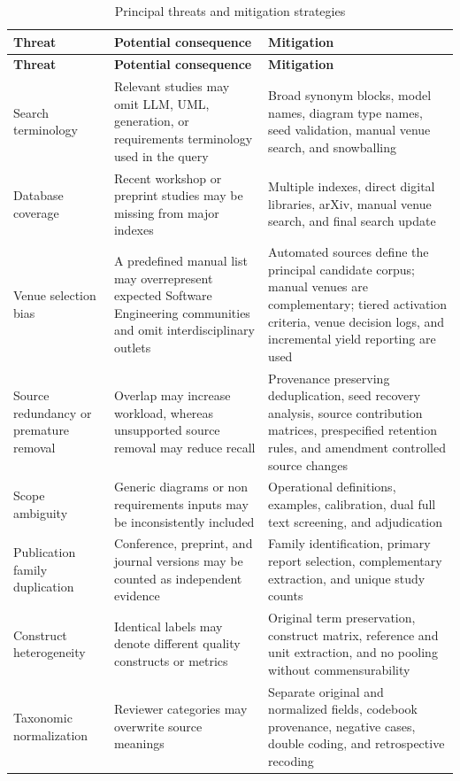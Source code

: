\begin{longtable}{p{} p{} p{}}
\caption{Principal threats and mitigation strategies}
\label{tab:protocol_threats}\\
\toprule
\textbf{Threat} & \textbf{Potential consequence} & \textbf{Mitigation} \\
\midrule
\endfirsthead
\toprule
\textbf{Threat} & \textbf{Potential consequence} & \textbf{Mitigation} \\
\midrule
\endhead
Search terminology & Relevant studies may omit LLM, UML, generation, or requirements terminology used in the query & Broad synonym blocks, model names, diagram type names, seed validation, manual venue search, and snowballing \\
Database coverage & Recent workshop or preprint studies may be missing from major indexes & Multiple indexes, direct digital libraries, arXiv, manual venue search, and final search update \\
Venue selection bias & A predefined manual list may overrepresent expected Software Engineering communities and omit interdisciplinary outlets & Automated sources define the principal candidate corpus; manual venues are complementary; tiered activation criteria, venue decision logs, and incremental yield reporting are used \\
Source redundancy or premature removal & Overlap may increase workload, whereas unsupported source removal may reduce recall & Provenance preserving deduplication, seed recovery analysis, source contribution matrices, prespecified retention rules, and amendment controlled source changes \\
Scope ambiguity & Generic diagrams or non requirements inputs may be inconsistently included & Operational definitions, examples, calibration, dual full text screening, and adjudication \\
Publication family duplication & Conference, preprint, and journal versions may be counted as independent evidence & Family identification, primary report selection, complementary extraction, and unique study counts \\
Construct heterogeneity & Identical labels may denote different quality constructs or metrics & Original term preservation, construct matrix, reference and unit extraction, and no pooling without commensurability \\
Taxonomic normalization & Reviewer categories may overwrite source meanings & Separate original and normalized fields, codebook provenance, negative cases, double coding, and retrospective recoding \\

\end{longtable}
